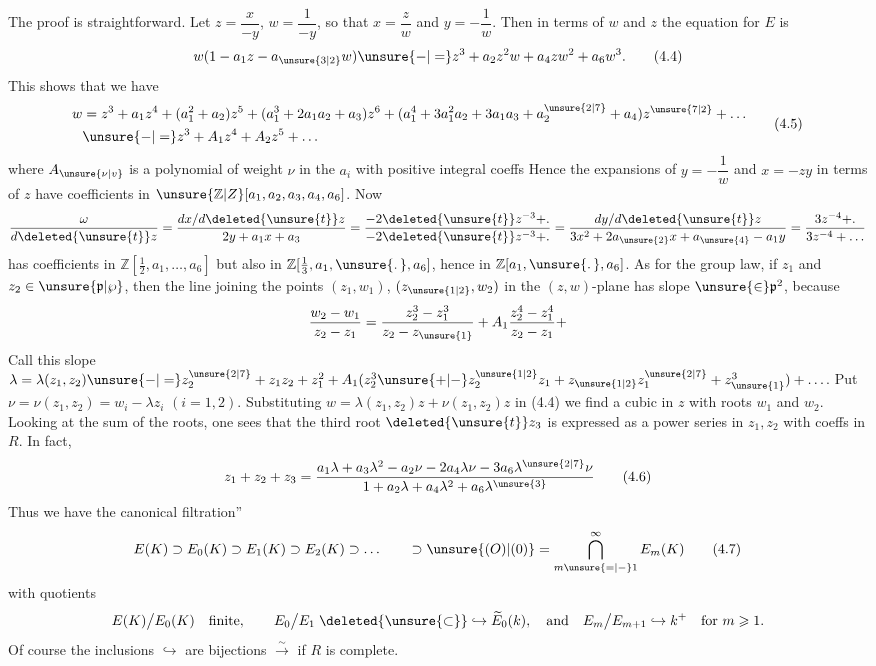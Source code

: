 \begingroup
\makeatletter\tagsleft@true\makeatother
The proof is straightforward. Let $z=\dfrac{x}{-y}$, $w=\dfrac{1}{-y}$, so that $x=\dfrac{z}{w}$ and $y=-\dfrac{1}{w}$. Then in terms of $w$ and $z$ the equation for $E$ is
\[
 w(1-a_1z-a_{\unsure{3|2}}w)\unsure{-|=}z^3+a_2z^2w+a_4zw^2+a_6w^3.
 \tag*{(4.4)}
\]
This shows that we have
\begingroup\scriptsize
\[
\begin{aligned}
w&=z^3+a_1z^4+(a_1^2+a_2)z^5+(a_1^3+2a_1a_2+a_3)z^6+
 (a_1^4+3a_1^2a_2+3a_1a_3+a_2^{\unsure{2|7}}+a_4)z^{\unsure{7|2}}+\ldots\\
 &\unsure{-|=}z^3+A_1z^4+A_2z^5+\ldots
\end{aligned}
\tag*{(4.5)}
\]
\endgroup
where $A_{\unsure{\nu|v}}$ is a polynomial of weight $\nu$ in the $a_i$ with positive integral coeffs Hence the expansions of $y=-\dfrac{1}{w}$ and $x=-zy$ in terms of $z$ have coefficients in $\unsure{\mathbb{Z}|Z}[a_1,a_2,a_3,a_4,a_6]$. Now
\[
 \frac{\omega}{d\deleted{\unsure{t}}z}=
 \frac{dx/d\deleted{\unsure{t}}z}{2y+a_1x+a_3}=
 \frac{-2\deleted{\unsure{t}}z^{-3}+\ldotp}{-2\deleted{\unsure{t}}z^{-3}+\ldotp}=
 \frac{dy/d\deleted{\unsure{t}}z}{3x^2+2a_{\unsure{2}}x+a_{\unsure{4}}-a_1y}=
 \frac{3z^{-4}+\ldotp}{3z^{-4}+\ldots}
\]
has coefficients in $\mathbb{Z}[\frac{1}{2},a_1,\ldots,a_6]$ but also in $\mathbb{Z}[\frac{1}{3},a_1,\unsure{\ldotp},a_6]$, hence in $\mathbb{Z}[a_1,\unsure{\ldotp},a_6]$. As for the group law, if $z_1$ and $z_2\in\unsure{\mathfrak{p}|\wp}$, then the line joining the points $(z_1,w_1)$, $(z_{\unsure{1|2}},w_2)$ in the $(z,w)$-plane has slope $\unsure{\in}\mathfrak{p}^2$, because
\[
 \frac{w_2-w_1}{z_2-z_1}=
 \frac{z_2^3-z_1^3}{z_2-z_{\unsure{1}}}
 +A_1\frac{z_2^4-z_1^4}{z_2-z_1}+
\]
Call this slope $\lambda=\lambda(z_1,z_2)\unsure{-|=}z_2^{\unsure{2|7}}+z_1z_2+z_1^2+A_1(z_2^3\unsure{+|-}z_2^{\unsure{1|2}}z_1+z_{\unsure{1|2}}z_1^{\unsure{2|7}}+z_{\unsure{1}}^3)+\ldots$. Put $\nu=\nu(z_1,z_2)=w_i-\lambda z_i$ $(i=1,2)$. Substituting $w=\lambda(z_1,z_2)z+\nu(z_1,z_2)z$ in (4.4) we find a cubic in $z$ with roots $w_1$ and $w_2$. Looking at the sum of the roots, one sees that the third root $\deleted{\unsure{t}}z_3$ is expressed as a power series in $z_1,z_2$ with coeffs in $R$. In fact,
\[
 z_1+z_2+z_3=
 \frac{a_1\lambda+a_3\lambda^2-a_2\nu-2a_4\lambda\nu-3a_6\lambda^{\unsure{2|7}}\nu}
 {1+a_2\lambda+a_4\lambda^2+a_6\lambda^{\unsure{3}}}
 \tag*{(4.6)}
\]
Thus we have the canonical filtration''
\[
 E(K)\supset E_0(K)\supset E_1(K)\supset E_2(K)\supset\ldots
 \qquad\supset\unsure{(O)|(0)}=\bigcap_{m\unsure{=|-}1}^{\infty}E_m(K)
 \tag*{(4.7)}
\]
with quotients
\begingroup\small
\[
 E(K)\big/E_0(K)\quad\text{finite},\qquad
 E_0\big/E_1\mathrel{\deleted{\unsure{\subset}}\hookrightarrow}\widetilde E_0(k),
 \quad\text{and}\quad E_m\big/E_{m+1}\hookrightarrow k^+
 \quad\text{for }m\geqslant1.
\]
\endgroup
Of course the inclusions $\hookrightarrow$ are bijections $\overset{\sim}{\to}$ if $R$ is complete.
\endgroup

